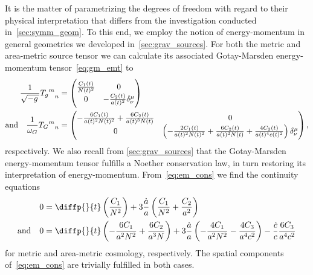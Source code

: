 
It is the matter of parametrizing the degrees of freedom with regard to their physical interpretation that differs from the investigation conducted in~\autoref{sec:symm_geom}. To this end, we employ the notion of energy-momentum in general geometries we developed in~\autoref{sec:grav_sources}. For both the metric and area-metric source tensor we can calculate its associated Gotay-Marsden energy-momentum tensor~\eqref{eq:gm_emt} to
\begin{align}
		\frac{1}{\sqrtmet}{{\EMt_\met}^m}_n&=\begin{pmatrix}
			\frac{\Const_1\oft}{\Nlapse\oft^2} & 0 \\
			0 & -\frac{\Const_2\oft}{\scalea\oft^2}\krond^\mu_\nu
		\end{pmatrix}
	\label{eq:em_met_raw}\\
	\text{and} \quad %
		\frac{1}{\volel_\armet}{{\EMt_\armet}^m}_n&=\begin{pmatrix}
			-\frac{6\Const_1\oft}{\scalea\oft^2\Nlapse\oft^2}+\frac{6\Const_2\oft}{\scalea\oft^3\Nlapse\oft} & 0 \\
			0 & \left(-\frac{2\Const_1\oft}{\scalea\oft^2\Nlapse\oft^2}+\frac{6\Const_2\oft}{\scalea\oft^3\Nlapse\oft}+\frac{4\Const_3\oft}{\scalea\oft^4\scalec\oft^2}\right)\krond^\mu_\nu
		\end{pmatrix}
 	\label{eq:em_armet_raw}
	\eqpunct{,}
\end{align}
respectively. We also recall from \autoref{sec:grav_sources} that the Gotay-Marsden energy-momentum tensor fulfills a Noether conservation law, in turn restoring its interpretation of energy-momentum. From~\eqref{eq:em_cons} we find the continuity equations
\begin{align}
	0&=\diffp{}{t}\left(\frac{\Const_1}{\Nlapse^2}\right)+3\frac{\dt{\scalea}}{\scalea}\left(\frac{\Const_1}{\Nlapse^2}+\frac{\Const_2}{\scalea^2}\right)\label{eq:cosmo_cont_met_raw}\\
	\text{and} \quad 0&=\diffp{}{t}\left(-\frac{6\Const_1}{\scalea^2\Nlapse^2}+\frac{6\Const_2}{\scalea^3\Nlapse}\right)+3\frac{\dt{\scalea}}{\scalea}\left(-\frac{4\Const_1}{\scalea^2\Nlapse^2}-\frac{4\Const_3}{\scalea^4\scalec^2}\right)-\frac{\dt{\scalec}}{\scalec}\frac{6\Const_3}{\scalea^4\scalec^2}\label{eq:cosmo_cont_armet_raw}
\end{align}
for metric and area-metric cosmology, respectively. The spatial components of~\eqref{eq:em_cons} are trivially fulfilled in both cases.

